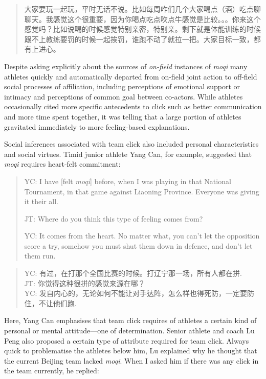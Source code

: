 \begin{CJK}{UTF8}{gbsn}
      \begin{quote}
        大家要玩一起玩，平时无话不说。比如每周咋们几个大家喝点（酒）吃点聊聊天。我感觉这个很重要，因为你喝点吃点吹点牛感觉是比较。。。你来这个感觉吗？比如说喝的时候感觉特别亲密，特别亲。剩下就是体能训练的时候跟不上教练要罚的时候一起挨罚，谁跑不动了就拉一把。大家目标一致，都有上进心。
      \end{quote}

Despite asking explicitly about the sources of \textit{on-field} instances of \textit{moqi} many athletes quickly and automatically departed from on-field joint action to off-field social processes of affiliation, including perceptions of emotional support or intimacy and perceptions of common goal between co-actors. While athletes occasionally cited more specific antecedents to click such as better communication and more time spent together, it was telling that a large portion of athletes gravitated immediately to more feeling-based explanations.

Social inferences associated with team click also included personal characteristics and social virtues.  Timid junior athlete Yang Can, for example, suggested that \textit{moqi} requires heart-felt commitment:

    \begin{quote}
      YC: I have [felt \textit{moqi}] before, when I was playing in that National Tournament, in that game against Liaoning Province.  Everyone was giving it their all.

      JT: Where do you think this type of feeling comes from?

      YC: It comes from the heart. No matter what, you can't let the opposition score a try, somehow you must shut them down in defence, and don't let them run.
    \end{quote}

    \begin{quote}
      YC: 有过，在打那个全国比赛的时候。打辽宁那一场，所有人都在拼.\\
      JT: 你觉得这种很拼的感觉来源在哪？\\
      YC: 发自内心的，无论如何不能让对手达阵，怎么样也得死防，一定要防住，不让他们跑.
    \end{quote}

Here, Yang Can emphasises that team click requires of athletes a certain kind of personal or mental attitude---one of determination.   Senior athlete and coach Lu Peng also proposed a certain type of attribute required for team click.  Always quick to problematise the athletes below him, Lu explained why he thought that the current Beijing team lacked \textit{moqi}.  When I asked him if there was any click in the team currently, he replied:


\end{CJK}
